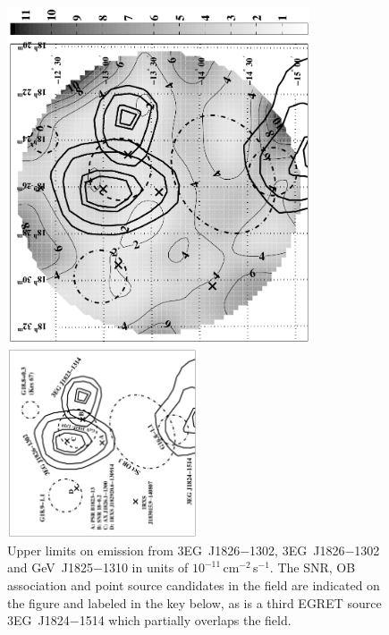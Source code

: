 \begin{figure}[p]
\centerline{\includegraphics[draft=false,angle=270,width=0.8\textwidth]{plots/chap-observations/loenergy/J1826-1302_sul_conv_bw.pdf}}
\centerline{\includegraphics[angle=270,width=0.5\textwidth]{plots/chap-observations/loenergy/J1826-1302_guide_bw.pdf}}
\caption{\label{FIG::OBSERVATIONS::J1826UL} Upper limits on emission 
from 3EG~J1826$-$1302, 3EG~J1826$-$1302 and GeV~J1825$-$1310 in units
of $10^{-11}$\,cm$^{-2}$\,s$^{-1}$. The SNR, OB association and
point source candidates in the field are indicated on the figure
and labeled in the key below, as is a third EGRET source
3EG~J1824$-$1514 which partially overlaps the field.}
\end{figure}

